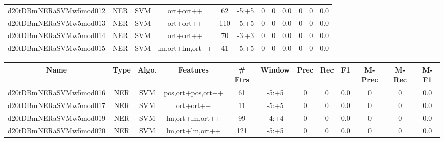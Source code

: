 \documentclass[a4paper]{article}
\begin{document}
\begin{landscape}
\begin{center}
\begin{tabular}{ |c|c|c|c|c|c|c|c|c|c|c|c|}
 
 	
 	\small{ d20tDBmNERaSVMw5mod012 } & \small{ NER} & \small{  SVM }  & ort+ort++  &  62 &  \small{  -5:+5 }  &  0 & 0 & 0.0  &  0 & 0 & 0.0 \\
 	

 
 	
 	\small{ d20tDBmNERaSVMw5mod013 } & \small{ NER} & \small{  SVM }  & ort+ort++  &  110 &  \small{  -5:+5 }  &  0 & 0 & 0.0  &  0 & 0 & 0.0 \\
 	

 
 	
 	\small{ d20tDBmNERaSVMw5mod014 } & \small{ NER} & \small{  SVM }  & ort+ort++  &  70 &  \small{  -3:+3 }  &  0 & 0 & 0.0  &  0 & 0 & 0.0 \\
 	

 
 	
 	\small{ d20tDBmNERaSVMw5mod015 } & \small{ NER} & \small{  SVM }  & lm,ort+lm,ort++  &  41 &  \small{  -5:+5 }  &  0 & 0 & 0.0  &  0 & 0 & 0.0 \\
 	
 \hline
\end{tabular}
\end{center}




\begin{center}
\begin{tabular}{ |c|c|c|c|c|c|c|c|c|c|c|c|} 
 \hline
 	Name & Type & Algo. & Features & \# Ftrs & Window & Prec & Rec & F1 & M-Prec & M-Rec & M-F1\\
 \hline

 	

 
 	
 	\small{ d20tDBmNERaSVMw5mod016 } & \small{ NER} & \small{  SVM }  & pos,ort+pos,ort++  &  61 &  \small{  -5:+5 }  &  0 & 0 & 0.0  &  0 & 0 & 0.0 \\
 	

 
 	
 	\small{ d20tDBmNERaSVMw5mod017 } & \small{ NER} & \small{  SVM }  & ort+ort++  &  11 &  \small{  -5:+5 }  &  0 & 0 & 0.0  &  0 & 0 & 0.0 \\
 	

 
 	
 	\small{ d20tDBmNERaSVMw5mod019 } & \small{ NER} & \small{  SVM }  & lm,ort+lm,ort++  &  99 &  \small{  -4:+4 }  &  0 & 0 & 0.0  &  0 & 0 & 0.0 \\
 	

 
 	
 	\small{ d20tDBmNERaSVMw5mod020 } & \small{ NER} & \small{  SVM }  & lm,ort+lm,ort++  &  121 &  \small{  -5:+5 }  &  0 & 0 & 0.0  &  0 & 0 & 0.0 \\
 	


\end{tabular}
\end{center}
\end{landscape}
\end{document}
